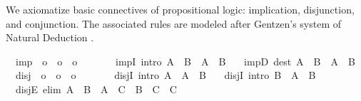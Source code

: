 \begin{isabellebody}
\begin{isamarkuptext}
\end{isamarkuptext}%
\isamarkuptrue%
\isamarkupfalse%
%
\isamarkuptrue%
%
\begin{isamarkuptext}%
We axiomatize basic connectives of propositional logic: implication,
  disjunction, and conjunction.  The associated rules are modeled
  after Gentzen's system of Natural Deduction \cite{Gentzen:1935}.%
\end{isamarkuptext}%
\isamarkuptrue%
\isamarkupfalse%
\isanewline
\ \ imp\ {\isacharcolon}{\isacharcolon}\ {\isachardoublequoteopen}o\ {\isasymRightarrow}\ o\ {\isasymRightarrow}\ o{\isachardoublequoteclose}\ \ {\isacharparenleft}\ {\isachardoublequoteopen}{\isasymlongrightarrow}{\isachardoublequoteclose}\ {}{}{\isacharparenright}\ \isanewline
\ \ impI\ {\isacharbrackleft}intro{\isacharbrackright}{\isacharcolon}\ {\isachardoublequoteopen}{\isacharparenleft}A\ {\isasymLongrightarrow}\ B{\isacharparenright}\ {\isasymLongrightarrow}\ A\ {\isasymlongrightarrow}\ B{\isachardoublequoteclose}\ \isanewline
\ \ impD\ {\isacharbrackleft}dest{\isacharbrackright}{\isacharcolon}\ {\isachardoublequoteopen}{\isacharparenleft}A\ {\isasymlongrightarrow}\ B{\isacharparenright}\ {\isasymLongrightarrow}\ A\ {\isasymLongrightarrow}\ B{\isachardoublequoteclose}\isanewline
\isanewline
{}\isamarkupfalse%
\isanewline
\ \ disj\ {\isacharcolon}{\isacharcolon}\ {\isachardoublequoteopen}o\ {\isasymRightarrow}\ o\ {\isasymRightarrow}\ o{\isachardoublequoteclose}\ \ {\isacharparenleft}\ {\isachardoublequoteopen}{\isasymor}{\isachardoublequoteclose}\ {}{}{\isacharparenright}\ \isanewline
\ \ disjI\ {\isacharbrackleft}intro{\isacharbrackright}{\isacharcolon}\ {\isachardoublequoteopen}A\ {\isasymLongrightarrow}\ A\ {\isasymor}\ B{\isachardoublequoteclose}\ \isanewline
\ \ disjI\ {\isacharbrackleft}intro{\isacharbrackright}{\isacharcolon}\ {\isachardoublequoteopen}B\ {\isasymLongrightarrow}\ A\ {\isasymor}\ B{\isachardoublequoteclose}\ \isanewline
\ \ disjE\ {\isacharbrackleft}elim{\isacharbrackright}{\isacharcolon}\ {\isachardoublequoteopen}A\ {\isasymor}\ B\ {\isasymLongrightarrow}\ {\isacharparenleft}A\ {\isasymLongrightarrow}\ C{\isacharparenright}\ {\isasymLongrightarrow}\ {\isacharparenleft}B\ {\isasymLongrightarrow}\ C{\isacharparenright}\ {\isasymLongrightarrow}\ C{\isachardoublequoteclose}\isanewline

\end{isabellebody}
